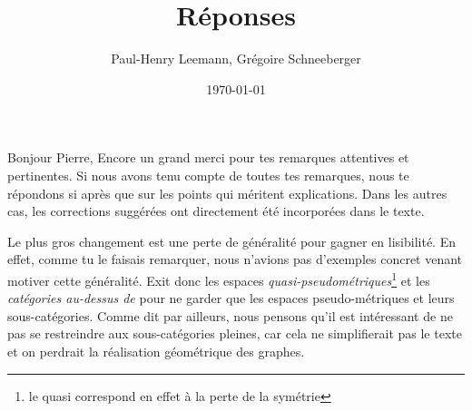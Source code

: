 \documentclass[a4paper]{article}
\title{Réponses}
\author{Paul-Henry Leemann, Grégoire Schneeberger}
\date{\today}
\theoremstyle{definition}
\begin{document}
\maketitle
%
%
%
%
%
%
%
%
%
%
Bonjour Pierre,
Encore un grand merci pour tes remarques attentives et pertinentes.
Si nous avons tenu compte de toutes tes remarques, nous te répondons si après que sur les points qui méritent explications. Dans les autres cas, les corrections suggérées ont directement été incorporées dans le texte.

Le plus gros changement est une perte de généralité pour gagner en lisibilité. En effet, comme tu le faisais remarquer, nous n'avions pas d'exemples concret venant motiver cette généralité. Exit donc les espaces \emph{quasi-pseudométriques}\footnote{le quasi correspond en effet à la perte de la symétrie} et les \emph{catégories au-dessus de} pour ne garder que les espaces pseudo-métriques et leurs sous-catégories.
Comme dit par ailleurs, nous pensons qu'il est intéressant de ne pas se restreindre aux sous-catégories pleines, car cela ne simplifierait pas le texte et on perdrait la réalisation géométrique des graphes.
\end{document}

